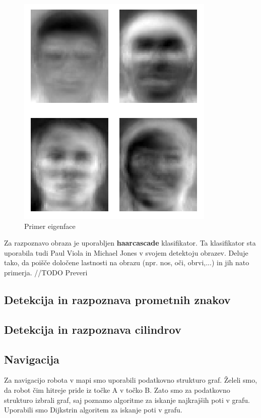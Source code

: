 \documentclass[a4paper,11pt]{article}
\begin{document}
\begin{figure}[h]
\begin{center}
\includegraphics[scale=0.4]{Eigenfaces.png}
\caption{Primer eigenface}
\label{slika1}
\end{center}
\end{figure}

Za razpoznavo obraza je uporabljen \textbf{haarcascade} klasifikator. Ta klasifikator sta uporabila tudi Paul Viola in Michael Jones v svojem detektoju obrazev. Deluje tako, da poišče določene lastnosti na obrazu (npr. nos, oči, obrvi,...) in jih nato primerja.
//TODO Preveri

\subsection{Detekcija in razpoznava prometnih znakov}
\subsection{Detekcija in razpoznava cilindrov}
\subsection{Navigacija}

Za navigacijo robota v mapi smo uporabili podatkovno strukturo graf. Želeli smo, da robot čim hitreje pride iz točke A v točko B. Zato smo za podatkovno strukturo izbrali graf, saj poznamo algoritme za iskanje najkrajših poti v grafu.
Uporabili smo Dijkstrin algoritem za iskanje poti v grafu.
\end{document}
